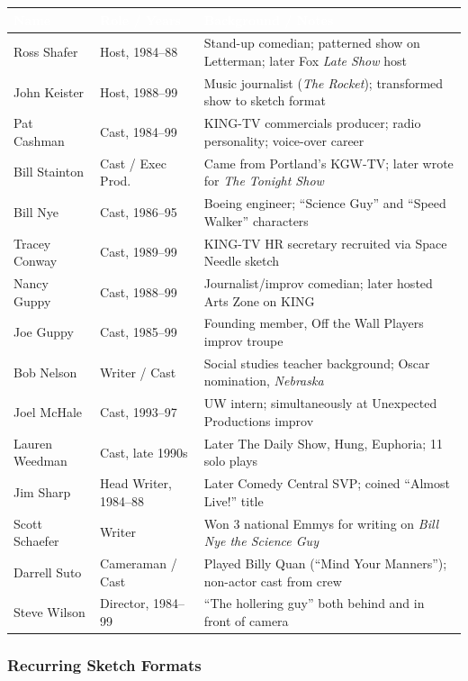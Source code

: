 \documentclass[11pt,letterpaper]{article}
\newcommand{\tableheader}[1]{\textbf{\sffamily\textcolor{white}{#1}}}
\begin{document}
\begin{center}
\begin{tabularx}{\textwidth}{L{3.5cm}L{2.5cm}X}
\toprule
{}
\tableheader{Name} & \tableheader{Role / Years} & \tableheader{Background / Notes} \\
\midrule
Ross Shafer & Host, 1984--88 & Stand-up comedian; patterned show on Letterman; later Fox \textit{Late Show} host \\
John Keister & Host, 1988--99 & Music journalist (\textit{The Rocket}); transformed show to sketch format \\
Pat Cashman & Cast, 1984--99 & KING-TV commercials producer; radio personality; voice-over career \\
Bill Stainton & Cast / Exec Prod. & Came from Portland's KGW-TV; later wrote for \textit{The Tonight Show} \\
Bill Nye & Cast, 1986--95 & Boeing engineer; ``Science Guy'' and ``Speed Walker'' characters \\
Tracey Conway & Cast, 1989--99 & KING-TV HR secretary recruited via Space Needle sketch \\
Nancy Guppy & Cast, 1988--99 & Journalist/improv comedian; later hosted Arts Zone on KING \\
Joe Guppy & Cast, 1985--99 & Founding member, Off the Wall Players improv troupe \\
Bob Nelson & Writer / Cast & Social studies teacher background; Oscar nomination, \textit{Nebraska} \\
Joel McHale & Cast, 1993--97 & UW intern; simultaneously at Unexpected Productions improv \\
Lauren Weedman & Cast, late 1990s & Later The Daily Show, Hung, Euphoria; 11 solo plays \\
Jim Sharp & Head Writer, 1984--88 & Later Comedy Central SVP; coined ``Almost Live!'' title \\
Scott Schaefer & Writer & Won 3 national Emmys for writing on \textit{Bill Nye the Science Guy} \\
Darrell Suto & Cameraman / Cast & Played Billy Quan (``Mind Your Manners''); non-actor cast from crew \\
Steve Wilson & Director, 1984--99 & ``The hollering guy'' both behind and in front of camera \\
\bottomrule
\end{tabularx}
\end{center}

\subsubsection{Recurring Sketch Formats}
\end{document}
